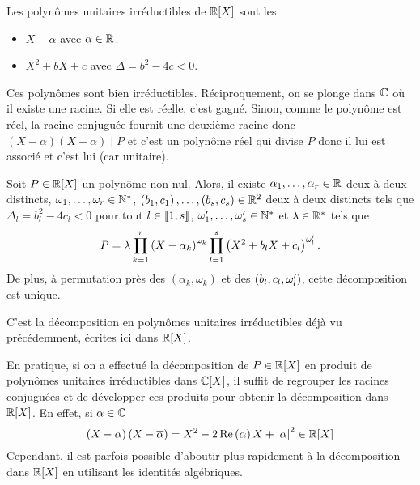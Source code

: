 \documentclass{magnolia}
\begin{document}
\begin{proposition}
Les polynômes unitaires irréductibles de $\polyR$ sont les
\begin{itemize}
\item $X-\alpha$ avec $\alpha\in\mathbb{R}$.
\item $X^2+bX+c$ avec $\Delta=b^2-4c<0$.
\end{itemize}
\end{proposition}

\begin{preuve}
Ces polynômes sont bien irréductibles. Réciproquement, on se plonge dans $\mathbb{C}$ où il existe une racine. Si elle est réelle, c'est gagné. Sinon, comme le polynôme est réel, la racine conjuguée fournit une deuxième racine donc $(X-\alpha)(X-\overline{\alpha})\mid P$ et c'est un polynôme réel qui divise $P$ donc il lui est associé et c'est lui (car unitaire).
\end{preuve}

\begin{proposition}
Soit $P\in\polyR$ un polynôme non nul. Alors, il existe
$\alpha_1,\ldots,\alpha_r\in\mathbb{R}$ deux à deux distincts,
$\omega_1,\ldots,\omega_r\in{\mathbb{N}^*}$,
$\left(b_1,c_1\right),\ldots,\left(b_s,c_s\right)\in\mathbb{R}^2$ deux à deux distincts tels que
$\Delta_l=b_l^2-4c_l<0$ pour tout $l\in\left\llbracket 1,s\right\rrbracket$,
$\omega_1',\ldots,\omega_s'\in{\mathbb{N}^*}$ et $\lambda\in{\mathbb{R}^*}$ tels que
\[P=\lambda \prod_{k=1}^r \left(X-\alpha_k\right)^{\omega_k}
    \prod_{l=1}^s \left(X^2+b_lX+c_l\right)^{\omega_l'}.\]
De plus, à permutation près des $(\alpha_k,\omega_k)$ et des $\left(b_l,c_l,\omega_l'\right)$, cette
décomposition est unique.
\end{proposition}

\begin{preuve}
C'est la décomposition en polynômes unitaires irréductibles déjà vu précédemment, écrites ici dans $\polyR$.
\end{preuve}

\begin{remarqueUnique}
\remarque En pratique, si on a effectué la décomposition de $P\in\polyR$
  en produit de polynômes unitaires irréductibles dans $\polyC$, il suffit
  de regrouper les racines conjuguées et de développer ces produits pour
  obtenir la décomposition dans $\polyR$. En effet, si $\alpha\in\mathbb{C}$
  \[\p{X-\alpha}\p{X-\conj{\alpha}}=X^2-2\Re\p{\alpha}X+\abs{\alpha}^2
    \in\polyR\]
  Cependant, il est parfois possible d'aboutir plus rapidement à la
  décomposition dans $\polyR$ en utilisant les identités algébriques.
\end{remarqueUnique}
\end{document}
